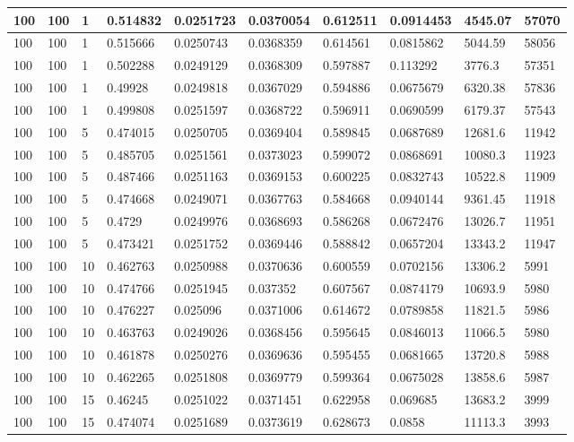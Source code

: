 \begin{landscape}
\begin{longtable}{ | l | l | l | l | l | l | l | l | l | l | }
100 & 100 & 1 & 0.514832 & 0.0251723 & 0.0370054 & 0.612511 & 0.0914453 & 4545.07 & 57070\\ \hline
100 & 100 & 1 & 0.515666 & 0.0250743 & 0.0368359 & 0.614561 & 0.0815862 & 5044.59 & 58056\\ \hline
100 & 100 & 1 & 0.502288 & 0.0249129 & 0.0368309 & 0.597887 & 0.113292 & 3776.3 & 57351\\ \hline
100 & 100 & 1 & 0.49928 & 0.0249818 & 0.0367029 & 0.594886 & 0.0675679 & 6320.38 & 57836\\ \hline
100 & 100 & 1 & 0.499808 & 0.0251597 & 0.0368722 & 0.596911 & 0.0690599 & 6179.37 & 57543\\ \hline
100 & 100 & 5 & 0.474015 & 0.0250705 & 0.0369404 & 0.589845 & 0.0687689 & 12681.6 & 11942\\ \hline
100 & 100 & 5 & 0.485705 & 0.0251561 & 0.0373023 & 0.599072 & 0.0868691 & 10080.3 & 11923\\ \hline
100 & 100 & 5 & 0.487466 & 0.0251163 & 0.0369153 & 0.600225 & 0.0832743 & 10522.8 & 11909\\ \hline
100 & 100 & 5 & 0.474668 & 0.0249071 & 0.0367763 & 0.584668 & 0.0940144 & 9361.45 & 11918\\ \hline
100 & 100 & 5 & 0.4729 & 0.0249976 & 0.0368693 & 0.586268 & 0.0672476 & 13026.7 & 11951\\ \hline
100 & 100 & 5 & 0.473421 & 0.0251752 & 0.0369446 & 0.588842 & 0.0657204 & 13343.2 & 11947\\ \hline
100 & 100 & 10 & 0.462763 & 0.0250988 & 0.0370636 & 0.600559 & 0.0702156 & 13306.2 & 5991\\ \hline
100 & 100 & 10 & 0.474766 & 0.0251945 & 0.037352 & 0.607567 & 0.0874179 & 10693.9 & 5980\\ \hline
100 & 100 & 10 & 0.476227 & 0.025096 & 0.0371006 & 0.614672 & 0.0789858 & 11821.5 & 5986\\ \hline
100 & 100 & 10 & 0.463763 & 0.0249026 & 0.0368456 & 0.595645 & 0.0846013 & 11066.5 & 5980\\ \hline
100 & 100 & 10 & 0.461878 & 0.0250276 & 0.0369636 & 0.595455 & 0.0681665 & 13720.8 & 5988\\ \hline
100 & 100 & 10 & 0.462265 & 0.0251808 & 0.0369779 & 0.599364 & 0.0675028 & 13858.6 & 5987\\ \hline
100 & 100 & 15 & 0.46245 & 0.0251022 & 0.0371451 & 0.622958 & 0.069685 & 13683.2 & 3999\\ \hline
100 & 100 & 15 & 0.474074 & 0.0251689 & 0.0373619 & 0.628673 & 0.0858 & 11113.3 & 3993\\ \hline

\end{longtable}
\end{landscape}
